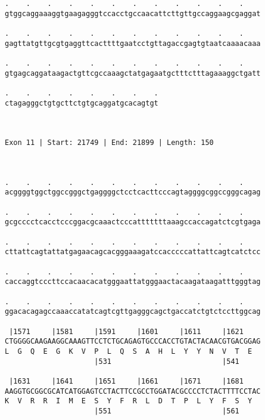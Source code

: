 \documentclass{article}
\begin{document}
\begin{Verbatim}
.    .    .    .    .    .    .    .    .    .    .    .    
gtggcaggaaaggtgaagagggtccacctgccaacattcttgttgccaggaagcgaggat
                                                            
.    .    .    .    .    .    .    .    .    .    .    .    
gagttatgttgcgtgaggttcacttttgaatcctgttagaccgagtgtaatcaaaacaaa
                                                            
.    .    .    .    .    .    .    .    .    .    .    .    
gtgagcaggataagactgttcgccaaagctatgagaatgctttctttagaaaggctgatt
                                                            
.    .    .    .    .    .    .    .
ctagagggctgtgcttctgtgcaggatgcacagtgt
                                    
                                    
 
Exon 11 | Start: 21749 | End: 21899 | Length: 150



.    .    .    .    .    .    .    .    .    .    .    .    
acggggtggctggccgggctgaggggctcctcacttcccagtaggggcggccgggcagag
                                                            
.    .    .    .    .    .    .    .    .    .    .    .    
gcgcccctcacctcccggacgcaaactcccatttttttaaagccaccagatctcgtgaga
                                                            
.    .    .    .    .    .    .    .    .    .    .    .    
cttattcagtattatgagaacagcacgggaaagatccacccccattattcagtcatctcc
                                                            
.    .    .    .    .    .    .    .    .    .    .    .    
caccaggtcccttccacaacacatgggaattatgggaactacaagataagatttgggtag
                                                            
.    .    .    .    .    .    .    .    .    .    .    .    
ggacacagagccaaaccatatcagtcgttgagggcagctgaccatctgtctccttggcag
                                                            
 |1571     |1581     |1591     |1601     |1611     |1621    
CTGGGGCAAGAAGGCAAAGTTCCTCTGCAGAGTGCCCACCTGTACTACAACGTGACGGAG
L  G  Q  E  G  K  V  P  L  Q  S  A  H  L  Y  Y  N  V  T  E  
                     |531                          |541     
  
 |1631     |1641     |1651     |1661     |1671     |1681    
AAGGTGCGGCGCATCATGGAGTCCTACTTCCGCCTGGATACGCCCCTCTACTTTTCCTAC
K  V  R  R  I  M  E  S  Y  F  R  L  D  T  P  L  Y  F  S  Y  
                     |551                          |561     
  

\end{Verbatim}
\end{document}
